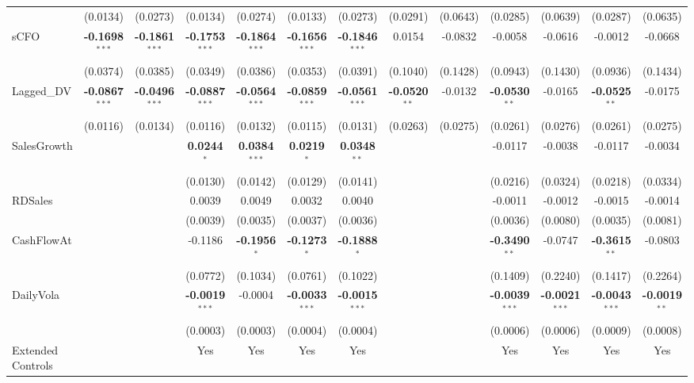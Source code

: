 \begin{landscape}
\begin{table}[H]
\begin{tabular}{lcccccccccccc}
 & (0.0134) & (0.0273) & (0.0134) & (0.0274) & (0.0133) & (0.0273) & (0.0291) & (0.0643) & (0.0285) & (0.0639) & (0.0287) & (0.0635) \\
sCFO & \textbf{-0.1698}$^{***}$ & \textbf{-0.1861}$^{***}$ & \textbf{-0.1753}$^{***}$ & \textbf{-0.1864}$^{***}$ & \textbf{-0.1656}$^{***}$ & \textbf{-0.1846}$^{***}$ & 0.0154 & -0.0832 & -0.0058 & -0.0616 & -0.0012 & -0.0668 \\
 & (0.0374) & (0.0385) & (0.0349) & (0.0386) & (0.0353) & (0.0391) & (0.1040) & (0.1428) & (0.0943) & (0.1430) & (0.0936) & (0.1434) \\
Lagged\_DV & \textbf{-0.0867}$^{***}$ & \textbf{-0.0496}$^{***}$ & \textbf{-0.0887}$^{***}$ & \textbf{-0.0564}$^{***}$ & \textbf{-0.0859}$^{***}$ & \textbf{-0.0561}$^{***}$ & \textbf{-0.0520}$^{**}$ & -0.0132 & \textbf{-0.0530}$^{**}$ & -0.0165 & \textbf{-0.0525}$^{**}$ & -0.0175 \\
 & (0.0116) & (0.0134) & (0.0116) & (0.0132) & (0.0115) & (0.0131) & (0.0263) & (0.0275) & (0.0261) & (0.0276) & (0.0261) & (0.0275) \\
SalesGrowth &  &  & \textbf{0.0244}$^{*}$ & \textbf{0.0384}$^{***}$ & \textbf{0.0219}$^{*}$ & \textbf{0.0348}$^{**}$ &  &  & -0.0117 & -0.0038 & -0.0117 & -0.0034 \\
 &  &  & (0.0130) & (0.0142) & (0.0129) & (0.0141) &  &  & (0.0216) & (0.0324) & (0.0218) & (0.0334) \\
RDSales &  &  & 0.0039 & 0.0049 & 0.0032 & 0.0040 &  &  & -0.0011 & -0.0012 & -0.0015 & -0.0014 \\
 &  &  & (0.0039) & (0.0035) & (0.0037) & (0.0036) &  &  & (0.0036) & (0.0080) & (0.0035) & (0.0081) \\
CashFlowAt &  &  & -0.1186 & \textbf{-0.1956}$^{*}$ & \textbf{-0.1273}$^{*}$ & \textbf{-0.1888}$^{*}$ &  &  & \textbf{-0.3490}$^{**}$ & -0.0747 & \textbf{-0.3615}$^{**}$ & -0.0803 \\
 &  &  & (0.0772) & (0.1034) & (0.0761) & (0.1022) &  &  & (0.1409) & (0.2240) & (0.1417) & (0.2264) \\
DailyVola &  &  & \textbf{-0.0019}$^{***}$ & -0.0004 & \textbf{-0.0033}$^{***}$ & \textbf{-0.0015}$^{***}$ &  &  & \textbf{-0.0039}$^{***}$ & \textbf{-0.0021}$^{***}$ & \textbf{-0.0043}$^{***}$ & \textbf{-0.0019}$^{**}$ \\
 &  &  & (0.0003) & (0.0003) & (0.0004) & (0.0004) &  &  & (0.0006) & (0.0006) & (0.0009) & (0.0008) \\
\midrule
Extended Controls &  &  & Yes & Yes & Yes & Yes &  &  & Yes & Yes & Yes & Yes \\

\end{tabular}
\end{table}
\end{landscape}
